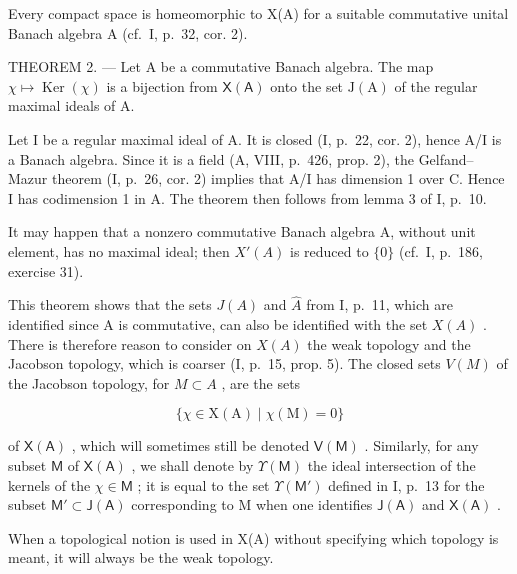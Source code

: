 Every compact space is homeomorphic to X(A) for a suitable commutative unital Banach algebra A (cf.~I, p.~32, cor. 2).

THEOREM 2. --- Let A be a commutative Banach algebra. The map \(\chi \mapsto \operatorname{Ker}(\chi)\) is a bijection from \(\mathsf{X}(\mathsf{A})\) onto the set \(\mathrm{J}(\mathrm{A})\) of the regular maximal ideals of A.

Let I be a regular maximal ideal of A. It is closed (I, p.~22, cor. 2), hence A/I is a Banach algebra. Since it is a field (A, VIII, p.~426, prop. 2), the Gelfand--Mazur theorem (I, p.~26, cor. 2) implies that A/I has dimension 1 over C. Hence I has codimension 1 in A. The theorem then follows from lemma 3 of I, p.~10.

It may happen that a nonzero commutative Banach algebra A, without unit element, has no maximal ideal; then \(X'(A)\) is reduced to \(\{0\}\) (cf.~I, p.~186, exercise 31).

This theorem shows that the sets \(J(A)\) and \(\hat{A}\) from I, p.~11, which are identified since A is commutative, can also be identified with the set \(X(A)\) . There is therefore reason to consider on \(X(A)\) the weak topology and the Jacobson topology, which is coarser (I, p.~15, prop. 5). The closed sets \(V(M)\) of the Jacobson topology, for \(M \subset A\) , are the sets

\[
\{\chi \in \mathrm{X} (\mathrm{A}) \mid \chi (\mathrm{M}) = 0 \}
\]

of \(\mathsf{X}(\mathsf{A})\) , which will sometimes still be denoted \(\mathsf{V}(\mathsf{M})\) . Similarly, for any subset \(\mathsf{M}\) of \(\mathsf{X}(\mathsf{A})\) , we shall denote by \(\Upsilon(\mathsf{M})\) the ideal intersection of the kernels of the \(\chi \in \mathsf{M}\) ; it is equal to the set \(\Upsilon(\mathsf{M}')\) defined in I, p.~13 for the subset \(\mathsf{M}' \subset \mathsf{J}(\mathsf{A})\) corresponding to M when one identifies \(\mathsf{J}(\mathsf{A})\) and \(\mathsf{X}(\mathsf{A})\) .

When a topological notion is used in X(A) without specifying which topology is meant, it will always be the weak topology.

